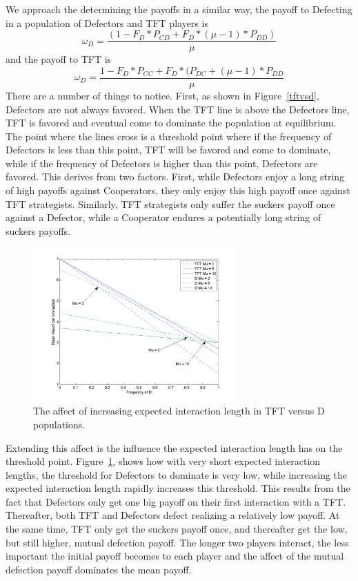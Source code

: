 \documentclass[11pt]{article} %
\begin{document}
We approach the determining the payoffs in a similar way, the payoff to Defecting in a population of Defectors and TFT players is
\begin{equation}
	\omega_{D} = \frac{(1-F_{D} *  P_{CD} +F_{D} *  (\mu - 1) * P_{DD})}{\mu}
	\label{d_in_dvstft}
\end{equation}
and  the payoff to TFT is
\begin{equation}
	\omega_{D} = \frac{1-F_{D} *P_{CC} + F_{D} * (P_{DC} + (\mu - 1) * P_{DD}}{\mu}
	\label{tft_in_dvstft}
\end{equation}
There are a number of things to notice. First, as shown in Figure~\ref{tftvsd}, Defectors are not always favored. When the TFT line is above the Defectors line, TFT is favored and eventual come to dominate the population at equilibrium. The point where the lines cross is a threshold point where if the frequency of Defectors is less than this point, TFT will be favored and come to dominate, while if the frequency of Defectors is higher than this point, Defectors are favored. This derives from two factors. First, while Defectors enjoy a long string of high payoffs against Cooperators, they only enjoy this high payoff once against TFT strategists. Similarly, TFT strategists only suffer the suckers payoff once against a Defector, while a Cooperator endures a potentially long string of suckers payoffs. 

\begin{figure}[ht]
	\includegraphics[width=0.7\textwidth]{payoffvsmu.png}
	\caption{The affect of increasing expected interaction length in TFT versus D populations.}
	\label{muintft}
\end{figure}

Extending this affect is the influence the expected interaction length has on the threshold point.  Figure~\ref{muintft}, shows how with very short expected interaction lengths, the threshold for Defectors to dominate is very low, while increasing the expected interaction length rapidly increases this threshold. This results from the fact that Defectors only get one big payoff on their first interaction with a TFT. Thereafter, both TFT and Defectors defect realizing a relatively low payoff. At the same time, TFT only get the suckers payoff once, and thereafter get the low, but still higher, mutual defection payoff. The longer two players interact, the less important the initial payoff becomes to each player and the affect of the mutual defection payoff dominates the mean payoff.
\end{document}
